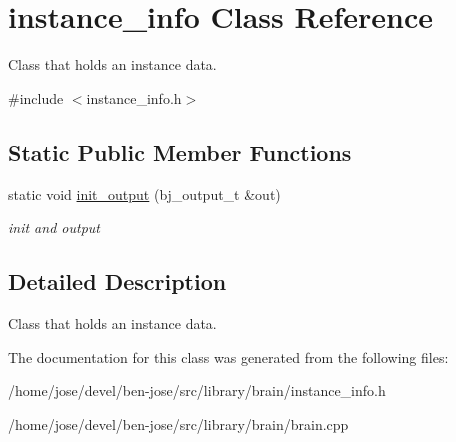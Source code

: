 \hypertarget{classinstance__info}{\section{instance\+\_\+info Class Reference}
\label{classinstance__info}
}


Class that holds an instance data.  




{\ttfamily \#include $<$instance\+\_\+info.\+h$>$}

\subsection*{Static Public Member Functions}
\begin{DoxyCompactItemize}
\item 
\hypertarget{classinstance__info_ac3abef1483f1c792526dae1b324bc7ee}{static void \hyperlink{classinstance__info_ac3abef1483f1c792526dae1b324bc7ee}{init\+\_\+output} (bj\+\_\+output\+\_\+t \&out)}\label{classinstance__info_ac3abef1483f1c792526dae1b324bc7ee}

\begin{DoxyCompactList}\small\item\em init and output \end{DoxyCompactList}\end{DoxyCompactItemize}


\subsection{Detailed Description}
Class that holds an instance data. 

The documentation for this class was generated from the following files\+:\begin{DoxyCompactItemize}
\item 
/home/jose/devel/ben-\/jose/src/library/brain/instance\+\_\+info.\+h\item 
/home/jose/devel/ben-\/jose/src/library/brain/brain.\+cpp\end{DoxyCompactItemize}
